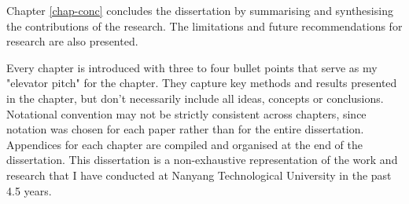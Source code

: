 Chapter \ref{chap-conc} concludes the dissertation by summarising and synthesising the contributions of the research. The limitations and future recommendations for research are also presented.

Every chapter is introduced with three to four bullet points that serve as my "elevator pitch" for the chapter. They capture key methods and results presented in the chapter, but don't necessarily include all ideas, concepts or conclusions. Notational convention may not be strictly consistent across chapters, since notation was chosen for each paper rather than for the entire dissertation. Appendices for each chapter are compiled and organised at the end of the dissertation. This dissertation is a non-exhaustive representation of the work and research that I have conducted at Nanyang Technological University in the past 4.5 years.
